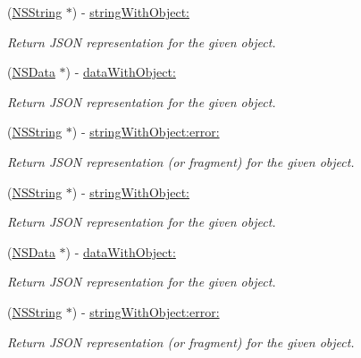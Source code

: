 \begin{DoxyCompactItemize}
\item 
(\hyperlink{class_n_s_string}{\-N\-S\-String} $\ast$) -\/ \hyperlink{interface_s_b_json_writer_a9018ceff9753092b310a43782c5083ed}{string\-With\-Object\-:}
\begin{DoxyCompactList}\small\item\em \-Return \-J\-S\-O\-N representation for the given object. \end{DoxyCompactList}\item 
(\hyperlink{class_n_s_data}{\-N\-S\-Data} $\ast$) -\/ \hyperlink{interface_s_b_json_writer_ad16f43f23b20d93983dae3441675a028}{data\-With\-Object\-:}
\begin{DoxyCompactList}\small\item\em \-Return \-J\-S\-O\-N representation for the given object. \end{DoxyCompactList}\item 
(\hyperlink{class_n_s_string}{\-N\-S\-String} $\ast$) -\/ \hyperlink{interface_s_b_json_writer_a41cfe2a66c774790785a841633cc0bc4}{string\-With\-Object\-:error\-:}
\begin{DoxyCompactList}\small\item\em \-Return \-J\-S\-O\-N representation (or fragment) for the given object. \end{DoxyCompactList}\item 
(\hyperlink{class_n_s_string}{\-N\-S\-String} $\ast$) -\/ \hyperlink{interface_s_b_json_writer_a98b0a676d8bc77281759765a5cc847fc}{string\-With\-Object\-:}
\begin{DoxyCompactList}\small\item\em \-Return \-J\-S\-O\-N representation for the given object. \end{DoxyCompactList}\item 
(\hyperlink{class_n_s_data}{\-N\-S\-Data} $\ast$) -\/ \hyperlink{interface_s_b_json_writer_a3f1687aa567c4a82cb7233b512d9802b}{data\-With\-Object\-:}
\begin{DoxyCompactList}\small\item\em \-Return \-J\-S\-O\-N representation for the given object. \end{DoxyCompactList}\item 
(\hyperlink{class_n_s_string}{\-N\-S\-String} $\ast$) -\/ \hyperlink{interface_s_b_json_writer_aaf36e759fdf6bfbada41d011ed402245}{string\-With\-Object\-:error\-:}
\begin{DoxyCompactList}\small\item\em \-Return \-J\-S\-O\-N representation (or fragment) for the given object. \end{DoxyCompactList}\item 

\end{DoxyCompactItemize}
